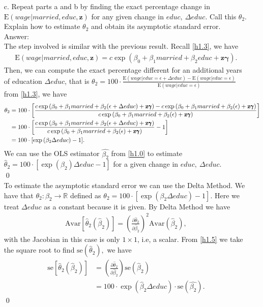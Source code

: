 \documentclass[10pt]{article}
\newcommand{\E}{\text{E}}
\newcommand{\Av}{\text{Avar}}
\newcommand{\se}{\text{se}}
\begin{document}
\begin{enumerate}
\item[c.] Repeat parts a and b by finding the exact percentage change in $\E(wage|married,educ,\mathbf{z})$ for any given change in $educ,\ \Delta educ.$ Call this $\theta_2.$ Explain how to estimate $\theta_2$ and obtain its asymptotic standard error.
\\ Answer:\\
The step involved is similar with the previous result. Recall \eqref{h1.3}, we have
\begin{align*}
    \E(wage|married,educ,\mathbf{z})=c\exp{(\beta_0+\beta_1 married +\beta_2 educ+\mathbf{z}\pmb{\gamma})}.
\end{align*}
Then, we can compute the exact percentage different for an additional years of education $\Delta educ$, that is $\theta_2=100\cdot\frac{\E(wage|educ=\epsilon+\Delta educ)-\E(wage|educ=\epsilon)}{\E(wage|educ=\epsilon)}$ from \eqref{h1.3}, we have
\begin{align}
    \theta_2&=100\cdot\left[\frac{c\exp{(\beta_0+\beta_1 married +\beta_2 (\epsilon+ \Delta educ)+\mathbf{z}\pmb{\gamma})}-c\exp{(\beta_0+\beta_1 married +\beta_2 (\epsilon)+\mathbf{z}\pmb{\gamma})}}{c\exp{(\beta_0+\beta_1 married +\beta_2 (\epsilon)+\mathbf{z}\pmb{\gamma})}}\right] \notag \\
    &=100\cdot\left[\frac{c\exp{(\beta_0+\beta_1 married +\beta_2 (\epsilon+ \Delta educ)+\mathbf{z}\pmb{\gamma})}}{c\exp{(\beta_0+\beta_1 married +\beta_2 (\epsilon)+\mathbf{z}\pmb{\gamma})}}-1\right] \notag \\
    &=100\cdot[\exp{(\beta_2\Delta educ)}-1]. \notag
\end{align} 
We can use the OLS estimator $\hat{\beta_2}$ from \eqref{h1.0} to estimate $\hat{\theta}_2=100\cdot[\exp{(\beta_2)}\Delta educ-1]$ for a given change in $educ,\ \Delta educ.$ 
\\ \qed \\
To estimate the asymptotic standard error we can use the Delta Method. We have that $\theta_2:\beta_2\to\mathbb{R}$ defined as $\theta_2=100\cdot[\exp{(\beta_2\Delta educ)} -1].$ Here we treat $\Delta educ$ as a constant because it is given. By Delta Method we have
\begin{align}
    \Av[\hat{\theta}_2(\hat{\beta}_2)]=\left(\frac{\partial\hat{\theta}_2}{\partial \hat{\beta}_2} \right)^2 \Av(\hat{\beta}_2), \label{h1.5}
\end{align}
with the Jacobian in this case is only $1\times 1$, i.e, a scalar. From \eqref{h1.5} we take the square root to find $\se(\hat{\theta}_2),$ we have
\begin{align*}
    \se[\hat{\theta}_2(\hat{\beta}_2)]&=\left(\frac{\partial\hat{\theta}_2}{\partial \hat{\beta}_2} \right) \se(\hat{\beta}_2) \\
    &=100\cdot\exp(\hat{\beta}_2 \Delta educ)\cdot \se(\hat{\beta_2}).
\end{align*}\qed



\end{enumerate}
\end{document}
